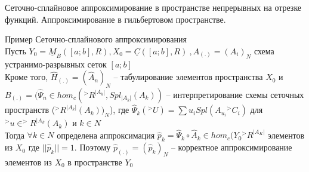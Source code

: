 \documentclass[__main__.tex]{subfiles}
\begin{document}
Сеточно-сплайновое аппроксимирование в пространстве непрерывных на отрезке функций. Аппроксимирование в гильбертовом пространстве.

Пример Сеточно-сплайнового аппроксимирования \\
Пусть $Y_0=\underline{M}_B([a;b],R),X_0=\underline{C}([a;b],R) \ ,A_{(.)}=(A_i)_N$ схема устранимо-разрывных сеток $[a;b]$\\
Кроме того, $\hat{H}_{(.)}=(\hat{A}_n)_N$ -- табулирование элементов пространства $X_0$ и $B_{(.)}=(\hat{\Psi}_n\in hom_c(^>R^{|A_k|},Spl_{|A_k|}(A_k))$ -- интерпретирование схемы сеточных пространств ($^>R^{|A_k|}(A_k))_N$), где $\hat{\Psi}_k(^>U)=\sum u_i Spl(A_{u_i}{^>C}_i)	$ для $^>u\in ^>R^{|A_k}(A_k)$  и  $k\in N$\\
Тогда $\forall k\in N$ определена аппроксимация $\hat{p}_k=\hat{\Psi}_k \circ \hat{A}_k \in hom_c(Y_0{^>R}^{|A_K|}$ элементов из $X_0$	где $||\hat{p}_k||=1$. Поэтому $\hat{p}_{(.)}=(\hat{p}_k)_N$ -- корректное аппроксимирование элементов из $X_0$  в пространстве $Y_0$
\end{document}
